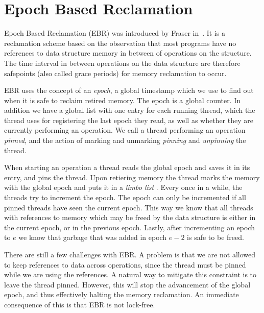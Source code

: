 \documentclass[b5paper,twoside]{report}
\begin{document}
\section{Epoch Based Reclamation}
Epoch Based Reclamation (EBR) was introduced by Fraser
in~\cite{fraser2004practical}.  It is a reclamation scheme based on the
observation that most programs have no references to data structure memory in
between of operations on the structure.  The time interval in between
operations on the data structure are therefore safepoints (also called grace
periods) for memory reclamation to occur.  

EBR uses the concept of an \emph{epoch}, a global timestamp which we use to
find out when it is safe to reclaim retired memory.  The epoch is a global
counter.  In addition we have a global list with one entry for each running
thread, which the thread uses for registering the last epoch they read, as well
as whether they are currently performing an operation.  We call a thread
performing an operation \emph{pinned}, and the action of marking and unmarking
\emph{pinning} and \emph{unpinning} the thread.

When starting an operation a thread reads the global epoch and saves it in its
entry, and pins the thread.  Upon retiering memory the thread marks the memory
with the global epoch and puts it in a \emph{limbo list} .  Every once in a while, the threads try to
increment the epoch.  The epoch can only be incremented if all pinned threads
have seen the current epoch. This way we know that all threads with references
to memory which may be freed by the data structure is either in the current
epoch, or in the previous epoch.  Lastly, after incrementing an epoch to $e$ we
know that garbage that was added in epoch $e-2$ is safe to be freed.


There are still a few challenges with EBR.  A problem is that we are not
allowed to keep references to data across operations, since the thread must be
pinned while we are using the references.  A natural way to mitigate this
constraint is to leave the thread pinned.  However, this will stop the
advancement of the global epoch, and thus effectively halting the memory
reclamation.  An immediate consequence of this is that EBR is not lock-free.
\end{document}
